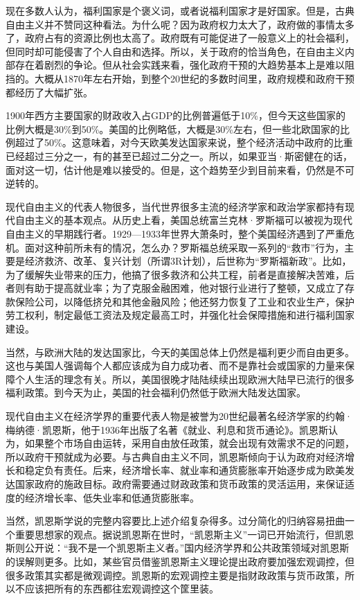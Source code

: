 现在多数人认为，福利国家是个褒义词，或者说福利国家才是好国家。但是，古典自由主义并不赞同这种看法。为什么呢？因为政府权力太大了，政府做的事情太多了，政府占有的资源比例也太高了。政府既有可能促进了一般意义上的社会福利，但同时却可能侵害了个人自由和选择。所以，关于政府的恰当角色，在自由主义内部存在着剧烈的争论。但从社会实践来看，强化政府干预的大趋势基本上是难以阻挡的。大概从1870年左右开始，到整个20世纪的多数时间里，政府规模和政府干预都经历了大幅扩张。

1900年西方主要国家的财政收入占GDP的比例普遍低于10\%，但今天这些国家的比例大概是30\%到50\%。美国的比例略低，大概是30\%左右，但一些北欧国家的比例超过了50\%。这意味着，对今天欧美发达国家来说，整个经济活动中政府的比重已经超过三分之一，有的甚至已超过二分之一。所以，如果亚当·斯密健在的话，面对这一切，估计他是难以接受的。但是，这个趋势至少到目前来看，仍然是不可逆转的。

现代自由主义的代表人物很多，当代世界很多主流的经济学家和政治学家都持有现代自由主义的基本观点。从历史上看，美国总统富兰克林·罗斯福可以被视为现代自由主义的早期践行者。1929—1933年世界大萧条时，整个美国经济遇到了严重危机。面对这种前所未有的情况，怎么办？罗斯福总统采取一系列的“救市”行为，主要是经济救济、改革、复兴计划（所谓3R计划），后世称为“罗斯福新政”。比如，为了缓解失业带来的压力，他搞了很多救济和公共工程，前者是直接解决苦难，后者则有助于提高就业率；为了克服金融困难，他对银行业进行了整顿，又成立了存款保险公司，以降低挤兑和其他金融风险；他还努力恢复了工业和农业生产，保护劳工权利，制定最低工资法及规定最高工时，并强化社会保障措施和进行福利国家建设。

当然，与欧洲大陆的发达国家比，今天的美国总体上仍然是福利更少而自由更多。这也与美国人强调每个人都应该成为自力成功者、而不是靠社会或国家的力量来保障个人生活的理念有关。所以，美国很晚才陆陆续续出现欧洲大陆早已流行的很多福利政策。到今天为止，美国的社会福利仍然低于欧洲大陆发达国家。

现代自由主义在经济学界的重要代表人物是被誉为20世纪最著名经济学家的约翰·梅纳德·凯恩斯，他于1936年出版了名著《就业、利息和货币通论》。凯恩斯认为，如果整个市场自由运转，采用自由放任政策，就会出现有效需求不足的问题，所以政府干预就成为必要。与古典自由主义不同，凯恩斯倾向于认为政府对经济增长和稳定负有责任。后来，经济增长率、就业率和通货膨胀率开始逐步成为欧美发达国家政府的施政目标。政府需要通过财政政策和货币政策的灵活运用，来保证适度的经济增长率、低失业率和低通货膨胀率。

当然，凯恩斯学说的完整内容要比上述介绍复杂得多。过分简化的归纳容易扭曲一个重要思想家的观点。据说凯恩斯在世时，“凯恩斯主义”一词已开始流行，但凯恩斯则公开说：“我不是一个凯恩斯主义者。”国内经济学界和公共政策领域对凯恩斯的误解则更多。比如，某些官员借鉴凯恩斯主义理论提出政府要加强宏观调控，但很多政策其实都是微观调控。凯恩斯的宏观调控主要是指财政政策与货币政策，所以不应该把所有的东西都往宏观调控这个筐里装。

